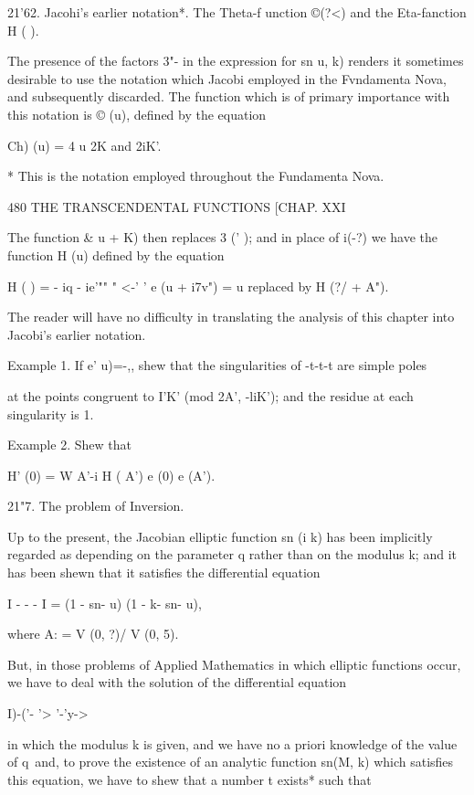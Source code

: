 21'62. Jacohi's earlier notation*. The Theta-f unction ©(?<) and the
Eta-fanction H ( ).

The presence of the factors 3"- in the expression for sn u, k) renders
it sometimes desirable to use the notation which Jacobi employed in
the Fvndamenta Nova, and subsequently discarded. The function which is
of primary importance with this notation is © (u), defined by the
equation

Ch) (u) = 4 u%
2K and 2iK'.

* This is the notation employed throughout the Fundamenta Nova.

480 THE TRANSCENDENTAL FUNCTIONS [CHAP. XXI

The function \& u + K) then replaces 3 (' ); and in place of i(-?) we
have the function H (u) defined by the equation

H ( ) = - iq - ie'"" " <-' ' e (u + i7v") = u%
replaced by H (?/ + A").

The reader will have no difficulty in translating the analysis of this
chapter into Jacobi's earlier notation.

Example 1. If e' u)=-,, shew that the singularities of -t-t-t are
simple poles

at the points congruent to I'K' (mod 2A', -liK'); and the residue at
each singularity is 1.

Example 2. Shew that

H' (0) = W A'-i H ( A') e (0) e (A').

21"7. The problem of Inversion.

Up to the present, the Jacobian elliptic function sn (i k) has been
implicitly regarded as depending on the parameter q rather than on the
modulus k; and it has been shewn that it satisfies the differential
equation

I - - - I = (1 - sn- u) (1 - k- sn- u),

where A: = V (0, ?)/ V (0, 5).

But, in those problems of Applied Mathematics in which elliptic
functions occur, we have to deal with the solution of the differential
equation

 I)-('- '> '-'y->

in which the modulus k is given, and we have no a priori knowledge of
the value of q\ and, to prove the existence of an analytic function
sn(M, k) which satisfies this equation, we have to shew that a number
t exists* such that

